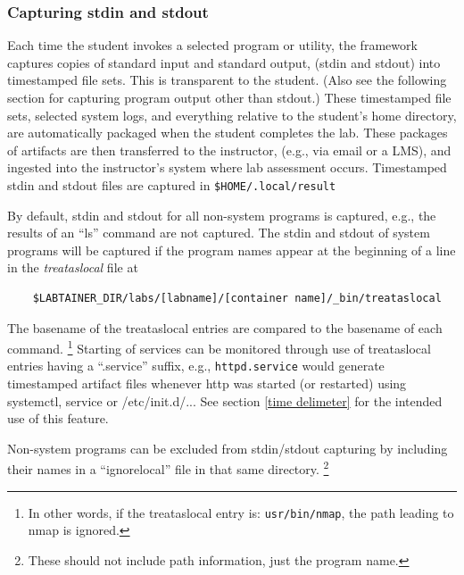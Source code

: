 \documentclass[12pt]{article}
\begin{document}
\subsubsection{Capturing stdin and stdout}
\label{stdin and stdout}
Each time the student invokes a selected program or utility, the 
framework captures copies of standard input and standard output, (stdin and stdout) into timestamped file sets.
This is transparent to the student.  (Also see the following section for capturing
program output other than stdout.)  These timestamped file sets, selected system logs,  and everything relative to
the student's home directory, are automatically packaged when the student completes the lab.
These packages of artifacts are then transferred to the instructor, (e.g., via email or a LMS), and 
ingested into the instructor's system where lab assessment occurs. Timestamped stdin and stdout files
are captured in \texttt{\$HOME/.local/result}

By default, stdin and stdout for all non-system programs is captured, e.g., the results of an ``ls'' command
are not captured.  The stdin and stdout of system programs will be captured if the program
names appear at the beginning of a line in the \textit{treataslocal} file at
\begin{verbatim}
    $LABTAINER_DIR/labs/[labname]/[container name]/_bin/treataslocal
\end{verbatim}
\noindent The basename of the treataslocal entries are compared to the basename of each command.
\footnote{In other words, if the treataslocal entry is: \texttt{usr/bin/nmap}, the path leading to nmap is ignored.}
Starting of services can be monitored through use of treataslocal entries having a ``.service'' suffix,
e.g., {\tt httpd.service} would generate timestamped artifact files whenever http was started (or restarted)
using systemctl, service or /etc/init.d/...  See section \ref{time delimeter} for the intended use of this feature.

Non-system programs can be excluded from stdin/stdout capturing by including their names in
a ``ignorelocal'' file in that same directory.  \footnote{These should not include path information, just the program name.}
\end{document}
